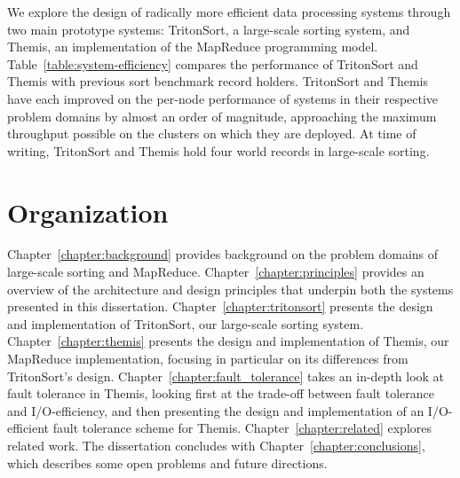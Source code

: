 We explore the design of radically more efficient data processing systems
through two main prototype systems: TritonSort, a large-scale sorting system,
and Themis, an implementation of the MapReduce programming
model. Table~\ref{table:system-efficiency} compares the performance of
TritonSort and Themis with previous sort benchmark record holders. TritonSort
and Themis have each improved on the per-node performance of systems in their
respective problem domains by almost an order of magnitude, approaching the
maximum throughput possible on the clusters on which they are deployed. At time
of writing, TritonSort and Themis hold four world records in large-scale
sorting.

\section{Organization}

Chapter~\ref{chapter:background} provides background on the problem domains of
large-scale sorting and MapReduce. Chapter~\ref{chapter:principles} provides an
overview of the architecture and design principles that underpin both the
systems presented in this dissertation. Chapter~\ref{chapter:tritonsort}
presents the design and implementation of TritonSort, our large-scale sorting
system. Chapter~\ref{chapter:themis} presents the design and implementation of
Themis, our MapReduce implementation, focusing in particular on its differences
from TritonSort's design. Chapter~\ref{chapter:fault_tolerance} takes an
in-depth look at fault tolerance in Themis, looking first at the trade-off
between fault tolerance and I/O-efficiency, and then presenting the design and
implementation of an I/O-efficient fault tolerance scheme for
Themis. Chapter~\ref{chapter:related} explores related work.  The dissertation
concludes with Chapter~\ref{chapter:conclusions}, which describes some open
problems and future directions.
